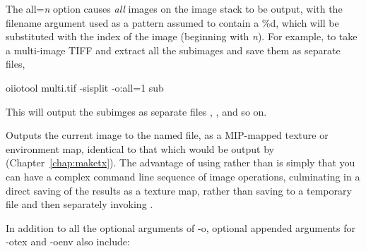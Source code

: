 The {\cf all=}\emph{n} option causes \emph{all} images on the image stack
to be output, with the
filename argument used as a pattern assumed to contain a {\cf \%d},
which will be substituted with the index of the image (beginning with
\emph{n}). For example, to take a multi-image TIFF and extract all the
subimages and save them as separate files,

\begin{code}
    oiiotool multi.tif -sisplit -o:all=1 sub%
\end{code}
\vspace{-12pt}
\noindent This will output the subimges as separate files ,
, and so on.

\apiend

\label{sec:oiiotool:otex}

Outputs the current image to the named file, as a MIP-mapped texture or
environment map, identical to that which would be output by \maketx
(Chapter~\ref{chap:maketx}). The advantage of using \oiiotool rather than
\maketx is simply that you can have a complex \oiiotool command line
sequence of image operations, culminating in a direct saving of the results
as a texture map, rather than saving to a temporary file and then separately
invoking \maketx.

\noindent In addition to all the optional arguments of {\cf -o}, optional
appended arguments for {\cf -otex} and {\cf -oenv} also include:

\smallskip

